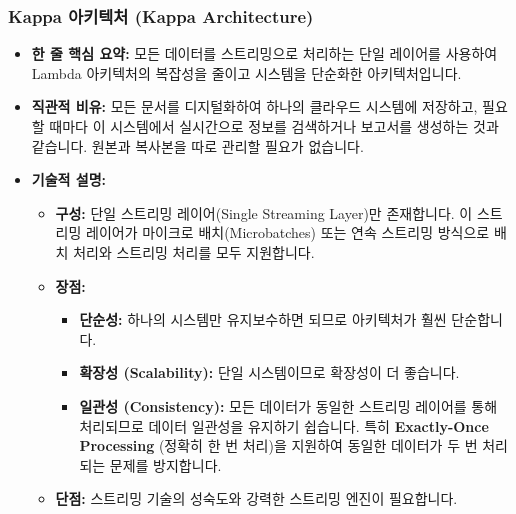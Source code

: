 \documentclass[11pt,a4paper]{article}
\theoremstyle{definition}
\begin{document}
\subsubsection{Kappa 아키텍처 (Kappa Architecture)}
\begin{itemize}
    \item \textbf{한 줄 핵심 요약:} 모든 데이터를 스트리밍으로 처리하는 단일 레이어를 사용하여 Lambda 아키텍처의 복잡성을 줄이고 시스템을 단순화한 아키텍처입니다.
    \item \textbf{직관적 비유:} 모든 문서를 디지털화하여 하나의 클라우드 시스템에 저장하고, 필요할 때마다 이 시스템에서 실시간으로 정보를 검색하거나 보고서를 생성하는 것과 같습니다. 원본과 복사본을 따로 관리할 필요가 없습니다.
    \item \textbf{기술적 설명:}
    \begin{itemize}
        \item \textbf{구성:} 단일 스트리밍 레이어(Single Streaming Layer)만 존재합니다. 이 스트리밍 레이어가 마이크로 배치(Microbatches) 또는 연속 스트리밍 방식으로 배치 처리와 스트리밍 처리를 모두 지원합니다.
        \item \textbf{장점:}
        \begin{itemize}
            \item \textbf{단순성:} 하나의 시스템만 유지보수하면 되므로 아키텍처가 훨씬 단순합니다.
            \item \textbf{확장성 (Scalability):} 단일 시스템이므로 확장성이 더 좋습니다.
            \item \textbf{일관성 (Consistency):} 모든 데이터가 동일한 스트리밍 레이어를 통해 처리되므로 데이터 일관성을 유지하기 쉽습니다. 특히 \textbf{Exactly-Once Processing} (정확히 한 번 처리)을 지원하여 동일한 데이터가 두 번 처리되는 문제를 방지합니다.
        \end{itemize}
        \item \textbf{단점:} 스트리밍 기술의 성숙도와 강력한 스트리밍 엔진이 필요합니다.
    \end{itemize}
\end{itemize}
\end{document}
